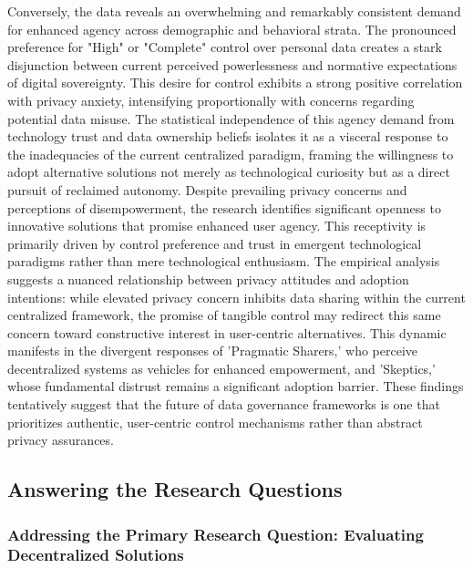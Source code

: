 	Conversely, the data reveals an overwhelming and remarkably consistent demand for enhanced agency across demographic and behavioral strata. The pronounced preference for "High" or "Complete" control over personal data creates a stark disjunction between current perceived powerlessness and normative expectations of digital sovereignty. This desire for control exhibits a strong positive correlation with privacy anxiety, intensifying proportionally with concerns regarding potential data misuse. The statistical independence of this agency demand from technology trust and data ownership beliefs isolates it as a visceral response to the inadequacies of the current centralized paradigm, framing the willingness to adopt alternative solutions not merely as technological curiosity but as a direct pursuit of reclaimed autonomy.
	Despite prevailing privacy concerns and perceptions of disempowerment, the research identifies significant openness to innovative solutions that promise enhanced user agency. This receptivity is primarily driven by control preference and trust in emergent technological paradigms rather than mere technological enthusiasm. The empirical analysis suggests a nuanced relationship between privacy attitudes and adoption intentions: while elevated privacy concern inhibits data sharing within the current centralized framework, the promise of tangible control may redirect this same concern toward constructive interest in user-centric alternatives. This dynamic manifests in the divergent responses of 'Pragmatic Sharers,' who perceive decentralized systems as vehicles for enhanced empowerment, and 'Skeptics,' whose fundamental distrust remains a significant adoption barrier. These findings tentatively suggest that the future of data governance frameworks is one that prioritizes authentic, user-centric control mechanisms rather than abstract privacy assurances.
\subsection{Answering the Research Questions}
	\subsubsection{Addressing the Primary Research Question: Evaluating Decentralized Solutions}

